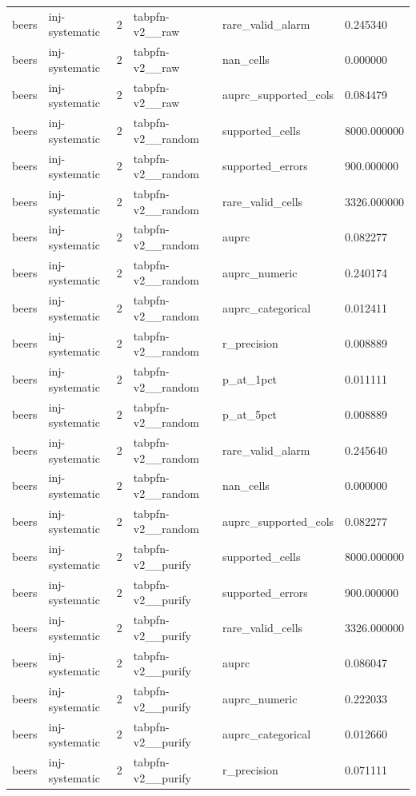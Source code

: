 \begin{tabular}{llllll}
beers & inj-systematic & 2 & tabpfn-v2\_\_raw & rare\_valid\_alarm & 0.245340 \\
beers & inj-systematic & 2 & tabpfn-v2\_\_raw & nan\_cells & 0.000000 \\
beers & inj-systematic & 2 & tabpfn-v2\_\_raw & auprc\_supported\_cols & 0.084479 \\
beers & inj-systematic & 2 & tabpfn-v2\_\_random & supported\_cells & 8000.000000 \\
beers & inj-systematic & 2 & tabpfn-v2\_\_random & supported\_errors & 900.000000 \\
beers & inj-systematic & 2 & tabpfn-v2\_\_random & rare\_valid\_cells & 3326.000000 \\
beers & inj-systematic & 2 & tabpfn-v2\_\_random & auprc & 0.082277 \\
beers & inj-systematic & 2 & tabpfn-v2\_\_random & auprc\_numeric & 0.240174 \\
beers & inj-systematic & 2 & tabpfn-v2\_\_random & auprc\_categorical & 0.012411 \\
beers & inj-systematic & 2 & tabpfn-v2\_\_random & r\_precision & 0.008889 \\
beers & inj-systematic & 2 & tabpfn-v2\_\_random & p\_at\_1pct & 0.011111 \\
beers & inj-systematic & 2 & tabpfn-v2\_\_random & p\_at\_5pct & 0.008889 \\
beers & inj-systematic & 2 & tabpfn-v2\_\_random & rare\_valid\_alarm & 0.245640 \\
beers & inj-systematic & 2 & tabpfn-v2\_\_random & nan\_cells & 0.000000 \\
beers & inj-systematic & 2 & tabpfn-v2\_\_random & auprc\_supported\_cols & 0.082277 \\
beers & inj-systematic & 2 & tabpfn-v2\_\_purify & supported\_cells & 8000.000000 \\
beers & inj-systematic & 2 & tabpfn-v2\_\_purify & supported\_errors & 900.000000 \\
beers & inj-systematic & 2 & tabpfn-v2\_\_purify & rare\_valid\_cells & 3326.000000 \\
beers & inj-systematic & 2 & tabpfn-v2\_\_purify & auprc & 0.086047 \\
beers & inj-systematic & 2 & tabpfn-v2\_\_purify & auprc\_numeric & 0.222033 \\
beers & inj-systematic & 2 & tabpfn-v2\_\_purify & auprc\_categorical & 0.012660 \\
beers & inj-systematic & 2 & tabpfn-v2\_\_purify & r\_precision & 0.071111 \\

\end{tabular}

